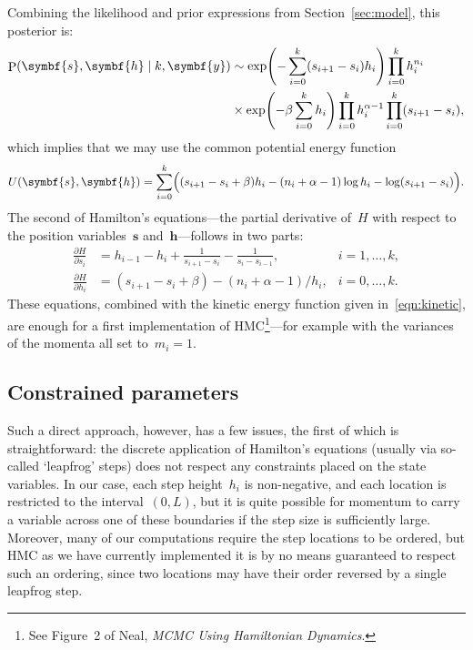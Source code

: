 \documentclass[11pt,a4paper]{article}
\newcommand\ub[1]{\symbf{#1}}                    %
\DeclareMathOperator\Pb{P}                       %
\DeclarePairedDelimiter\lr{\lparen}{\rparen}     %
\theoremstyle{definition}
\begin{document}
Combining the likelihood and prior expressions from Section~\ref{sec:model},
this posterior is:
\begin{align*}
  \Pb(\ub{s},\ub{h} \mid k,\ub{y}) &\sim
    \exp\lr*{-\sum_{i=0}^k (s_{i+1} - s_i)h_i} \prod_{i=0}^k h_i^{n_i} \\
  &\times \exp\lr*{-\beta \sum_{i=0}^k h_i} \prod_{i=0}^k h_i^{\alpha-1}
    \prod_{i=0}^k (s_{i+1} - s_i),
\end{align*}
which implies that we may use the common potential energy function
\[ U(\ub{s},\ub{h}) = \sum_{i=0}^k \lr[\Big]{(s_{i+1} - s_i + \beta)h_i
    - (n_i+\alpha-1)\log h_i - \log(s_{i+1} - s_i)}. \]
The second of Hamilton's equations---the partial derivative of~$H$ with respect
to the position variables~$\ub{s}$ and~$\ub{h}$---follows in two parts:
\begin{align*}
  \frac{\partial H}{\partial s_i} &= h_{i-1} - h_i + \frac{1}{s_{i+1} - s_i}
    - \frac{1}{s_i - s_{i-1}}, &i = 1,\dots,k, \\
  \frac{\partial H}{\partial h_i} &= (s_{i+1} - s_i + \beta)
    - (n_i+\alpha-1)/h_i, &i = 0,\dots,k.
\end{align*}
These equations, combined with the kinetic energy function given
in~\eqref{eqn:kinetic}, are enough for a first implementation of
HMC\footnote{See Figure~2 of Neal, \textit{MCMC Using Hamiltonian
Dynamics}.}---for example with the variances of the momenta all set to~$m_i =
1$.

\subsection{Constrained parameters} %

Such a direct approach, however, has a few issues, the first of which is
straightforward: the discrete application of Hamilton's equations (usually via
so-called `leapfrog' steps) does not respect any constraints placed on the state
variables. In our case, each step height~$h_i$ is non-negative, and each
location is restricted to the interval~$(0,L)$, but it is quite possible for
momentum to carry a variable across one of these boundaries if the step size is
sufficiently large. Moreover, many of our computations require the step
locations to be ordered, but HMC as we have currently implemented it is by no
means guaranteed to respect such an ordering, since two locations may have their
order reversed by a single leapfrog step.
\end{document}
